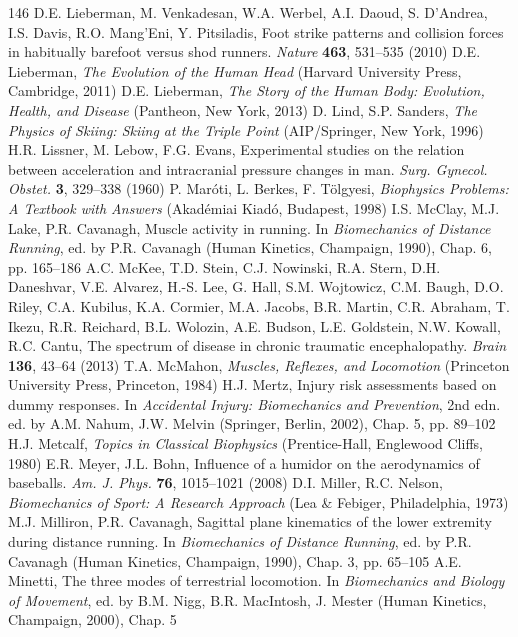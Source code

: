 \documentclass[12pt]{book}
\begin{document}
\begin{thebibliography}{146}
 D.E. Lieberman, M. Venkadesan, W.A. Werbel, A.I. Daoud, S. D'Andrea, I.S. Davis, R.O. Mang'Eni, Y. Pitsiladis, Foot strike patterns and collision forces in habitually barefoot versus shod runners. \textit{Nature} \textbf{463}, 531--535 (2010)
 D.E. Lieberman, \textit{The Evolution of the Human Head} (Harvard University Press, Cambridge, 2011)
 D.E. Lieberman, \textit{The Story of the Human Body: Evolution, Health, and Disease} (Pantheon, New York, 2013)
 D. Lind, S.P. Sanders, \textit{The Physics of Skiing: Skiing at the Triple Point} (AIP/Springer, New York, 1996)
 H.R. Lissner, M. Lebow, F.G. Evans, Experimental studies on the relation between acceleration and intracranial pressure changes in man. \textit{Surg. Gynecol. Obstet.} \textbf{3}, 329--338 (1960)
 P. Maróti, L. Berkes, F. Tölgyesi, \textit{Biophysics Problems: A Textbook with Answers} (Akadémiai Kiadó, Budapest, 1998)
 I.S. McClay, M.J. Lake, P.R. Cavanagh, Muscle activity in running. In \textit{Biomechanics of Distance Running}, ed. by P.R. Cavanagh (Human Kinetics, Champaign, 1990), Chap. 6, pp. 165--186
 A.C. McKee, T.D. Stein, C.J. Nowinski, R.A. Stern, D.H. Daneshvar, V.E. Alvarez, H.-S. Lee, G. Hall, S.M. Wojtowicz, C.M. Baugh, D.O. Riley, C.A. Kubilus, K.A. Cormier, M.A. Jacobs, B.R. Martin, C.R. Abraham, T. Ikezu, R.R. Reichard, B.L. Wolozin, A.E. Budson, L.E. Goldstein, N.W. Kowall, R.C. Cantu, The spectrum of disease in chronic traumatic encephalopathy. \textit{Brain} \textbf{136}, 43--64 (2013)
 T.A. McMahon, \textit{Muscles, Reflexes, and Locomotion} (Princeton University Press, Princeton, 1984)
 H.J. Mertz, Injury risk assessments based on dummy responses. In \textit{Accidental Injury: Biomechanics and Prevention}, 2nd edn. ed. by A.M. Nahum, J.W. Melvin (Springer, Berlin, 2002), Chap. 5, pp. 89--102
 H.J. Metcalf, \textit{Topics in Classical Biophysics} (Prentice-Hall, Englewood Cliffs, 1980)
 E.R. Meyer, J.L. Bohn, Influence of a humidor on the aerodynamics of baseballs. \textit{Am. J. Phys.} \textbf{76}, 1015--1021 (2008)
 D.I. Miller, R.C. Nelson, \textit{Biomechanics of Sport: A Research Approach} (Lea \& Febiger, Philadelphia, 1973)
 M.J. Milliron, P.R. Cavanagh, Sagittal plane kinematics of the lower extremity during distance running. In \textit{Biomechanics of Distance Running}, ed. by P.R. Cavanagh (Human Kinetics, Champaign, 1990), Chap. 3, pp. 65--105
 A.E. Minetti, The three modes of terrestrial locomotion. In \textit{Biomechanics and Biology of Movement}, ed. by B.M. Nigg, B.R. MacIntosh, J. Mester (Human Kinetics, Champaign, 2000), Chap. 5

\end{thebibliography}
\end{document}
